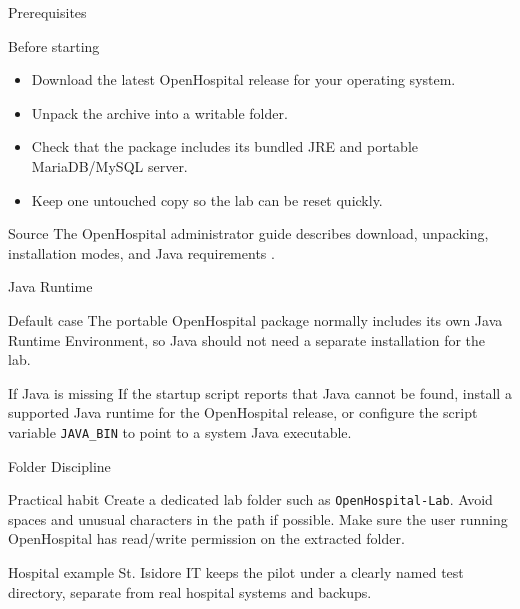 \documentclass[presentation]{beamer}
\begin{document}
\begin{frame}[c]{Prerequisites}
\begin{block}{Before starting}
\begin{itemize}
    \item Download the latest OpenHospital release for your operating system.
    \item Unpack the archive into a writable folder.
    \item Check that the package includes its bundled JRE and portable MariaDB/MySQL server.
    \item Keep one untouched copy so the lab can be reset quickly.
\end{itemize}
\end{block}

\begin{exampleblock}{Source}
The OpenHospital administrator guide describes download, unpacking, installation modes, and Java
requirements \cite{openhospital_admin}.
\end{exampleblock}
\end{frame}

\begin{frame}[c]{Java Runtime}
\begin{block}{Default case}
The portable OpenHospital package normally includes its own Java Runtime Environment, so Java should
not need a separate installation for the lab.
\end{block}

\begin{exampleblock}{If Java is missing}
If the startup script reports that Java cannot be found, install a supported Java runtime for the
OpenHospital release, or configure the script variable \texttt{JAVA\_BIN} to point to a system Java
executable.
\end{exampleblock}
\end{frame}

\begin{frame}[c]{Folder Discipline}
\begin{block}{Practical habit}
Create a dedicated lab folder such as \texttt{OpenHospital-Lab}. Avoid spaces and unusual
characters in the path if possible. Make sure the user running OpenHospital has read/write
permission on the extracted folder.
\end{block}

\begin{exampleblock}{Hospital example}
St. Isidore IT keeps the pilot under a clearly named test directory, separate from real hospital
systems and backups.
\end{exampleblock}
\end{frame}
\end{document}
